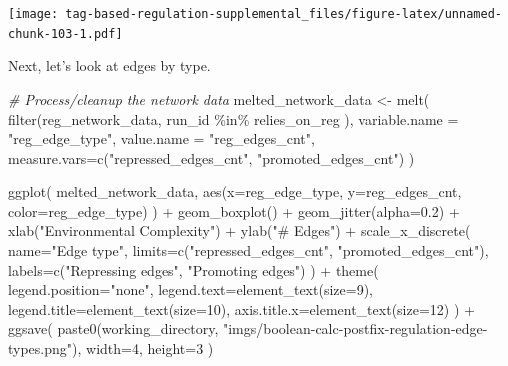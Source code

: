 \documentclass[
]{book}
\newenvironment{Shaded}{\begin{snugshade}}{\end{snugshade}}
\newcommand{\AttributeTok}[1]{\textcolor[rgb]{0.77,0.63,0.00}{#1}}
\newcommand{\CommentTok}[1]{\textcolor[rgb]{0.56,0.35,0.01}{\textit{#1}}}
\newcommand{\DecValTok}[1]{\textcolor[rgb]{0.00,0.00,0.81}{#1}}
\newcommand{\FloatTok}[1]{\textcolor[rgb]{0.00,0.00,0.81}{#1}}
\newcommand{\FunctionTok}[1]{\textcolor[rgb]{0.00,0.00,0.00}{#1}}
\newcommand{\NormalTok}[1]{#1}
\newcommand{\OtherTok}[1]{\textcolor[rgb]{0.56,0.35,0.01}{#1}}
\newcommand{\SpecialCharTok}[1]{\textcolor[rgb]{0.00,0.00,0.00}{#1}}
\newcommand{\StringTok}[1]{\textcolor[rgb]{0.31,0.60,0.02}{#1}}
\begin{document}
\texttt{[image: tag-based-regulation-supplemental\_files/figure-latex/unnamed-chunk-103-1.pdf]}

Next, let's look at edges by type.

\begin{Shaded}
\begin{Highlighting}[]
\CommentTok{\# Process/cleanup the network data}
\NormalTok{melted\_network\_data }\OtherTok{\textless{}{-}} \FunctionTok{melt}\NormalTok{(}
  \FunctionTok{filter}\NormalTok{(reg\_network\_data,}
\NormalTok{         run\_id }\SpecialCharTok{\%in\%}\NormalTok{ relies\_on\_reg}
\NormalTok{        ),}
  \AttributeTok{variable.name =} \StringTok{"reg\_edge\_type"}\NormalTok{,}
  \AttributeTok{value.name =} \StringTok{"reg\_edges\_cnt"}\NormalTok{,}
  \AttributeTok{measure.vars=}\FunctionTok{c}\NormalTok{(}\StringTok{"repressed\_edges\_cnt"}\NormalTok{, }\StringTok{"promoted\_edges\_cnt"}\NormalTok{)}
\NormalTok{)}

\FunctionTok{ggplot}\NormalTok{( melted\_network\_data, }\FunctionTok{aes}\NormalTok{(}\AttributeTok{x=}\NormalTok{reg\_edge\_type, }\AttributeTok{y=}\NormalTok{reg\_edges\_cnt, }\AttributeTok{color=}\NormalTok{reg\_edge\_type) ) }\SpecialCharTok{+}
  \FunctionTok{geom\_boxplot}\NormalTok{() }\SpecialCharTok{+}
  \FunctionTok{geom\_jitter}\NormalTok{(}\AttributeTok{alpha=}\FloatTok{0.2}\NormalTok{) }\SpecialCharTok{+}
  \FunctionTok{xlab}\NormalTok{(}\StringTok{"Environmental Complexity"}\NormalTok{) }\SpecialCharTok{+}
  \FunctionTok{ylab}\NormalTok{(}\StringTok{"\# Edges"}\NormalTok{) }\SpecialCharTok{+}
  \FunctionTok{scale\_x\_discrete}\NormalTok{(}
    \AttributeTok{name=}\StringTok{"Edge type"}\NormalTok{,}
    \AttributeTok{limits=}\FunctionTok{c}\NormalTok{(}\StringTok{"repressed\_edges\_cnt"}\NormalTok{, }\StringTok{"promoted\_edges\_cnt"}\NormalTok{),}
    \AttributeTok{labels=}\FunctionTok{c}\NormalTok{(}\StringTok{"Repressing edges"}\NormalTok{, }\StringTok{"Promoting edges"}\NormalTok{)}
\NormalTok{  ) }\SpecialCharTok{+}
  \FunctionTok{theme}\NormalTok{(}
    \AttributeTok{legend.position=}\StringTok{"none"}\NormalTok{,}
    \AttributeTok{legend.text=}\FunctionTok{element\_text}\NormalTok{(}\AttributeTok{size=}\DecValTok{9}\NormalTok{),}
    \AttributeTok{legend.title=}\FunctionTok{element\_text}\NormalTok{(}\AttributeTok{size=}\DecValTok{10}\NormalTok{),}
    \AttributeTok{axis.title.x=}\FunctionTok{element\_text}\NormalTok{(}\AttributeTok{size=}\DecValTok{12}\NormalTok{)}
\NormalTok{  ) }\SpecialCharTok{+}
  \FunctionTok{ggsave}\NormalTok{(}
    \FunctionTok{paste0}\NormalTok{(working\_directory, }\StringTok{"imgs/boolean{-}calc{-}postfix{-}regulation{-}edge{-}types.png"}\NormalTok{),}
    \AttributeTok{width=}\DecValTok{4}\NormalTok{,}
    \AttributeTok{height=}\DecValTok{3}
\NormalTok{  )}
\end{Highlighting}
\end{Shaded}
\end{document}
